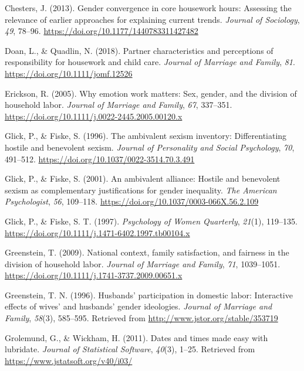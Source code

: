 \documentclass[
  man]{apa6}
\newlength{\cslhangindent}
\newlength{\cslentryspacingunit} %
\newenvironment{CSLReferences}[2] %
 {%
  \setlength{\parindent}{0pt}
  \ifodd #1
  \let\oldpar\par
  \def\par{\hangindent=\cslhangindent\oldpar}
  \fi
  \setlength{\parskip}{#2\cslentryspacingunit}
 }%
 {}
\begin{document}
\begin{CSLReferences}{1}{0}
\leavevmode{}%
Chesters, J. (2013). Gender convergence in core housework hours: Assessing the relevance of earlier approaches for explaining current trends. \emph{Journal of Sociology}, \emph{49}, 78--96. \url{https://doi.org/10.1177/1440783311427482}

\leavevmode{}%
Doan, L., \& Quadlin, N. (2018). Partner characteristics and perceptions of responsibility for housework and child care. \emph{Journal of Marriage and Family}, \emph{81}. \url{https://doi.org/10.1111/jomf.12526}

\leavevmode{}%
Erickson, R. (2005). Why emotion work matters: Sex, gender, and the division of household labor. \emph{Journal of Marriage and Family}, \emph{67}, 337--351. \url{https://doi.org/10.1111/j.0022-2445.2005.00120.x}

\leavevmode{}%
Glick, P., \& Fiske, S. (1996). The ambivalent sexism inventory: Differentiating hostile and benevolent sexism. \emph{Journal of Personality and Social Psychology}, \emph{70}, 491--512. \url{https://doi.org/10.1037/0022-3514.70.3.491}

\leavevmode{}%
Glick, P., \& Fiske, S. (2001). An ambivalent alliance: Hostile and benevolent sexism as complementary justifications for gender inequality. \emph{The American Psychologist}, \emph{56}, 109--118. \url{https://doi.org/10.1037/0003-066X.56.2.109}

\leavevmode{}%
Glick, P., \& Fiske, S. T. (1997). \emph{Psychology of Women Quarterly}, \emph{21}(1), 119--135. \url{https://doi.org/10.1111/j.1471-6402.1997.tb00104.x}

\leavevmode{}%
Greenstein, T. (2009). National context, family satisfaction, and fairness in the division of household labor. \emph{Journal of Marriage and Family}, \emph{71}, 1039--1051. \url{https://doi.org/10.1111/j.1741-3737.2009.00651.x}

\leavevmode{}%
Greenstein, T. N. (1996). Husbands' participation in domestic labor: Interactive effects of wives' and husbands' gender ideologies. \emph{Journal of Marriage and Family}, \emph{58}(3), 585--595. Retrieved from \url{http://www.jstor.org/stable/353719}

\leavevmode{}%
Grolemund, G., \& Wickham, H. (2011). Dates and times made easy with {lubridate}. \emph{Journal of Statistical Software}, \emph{40}(3), 1--25. Retrieved from \url{https://www.jstatsoft.org/v40/i03/}


\end{CSLReferences}
\end{document}
